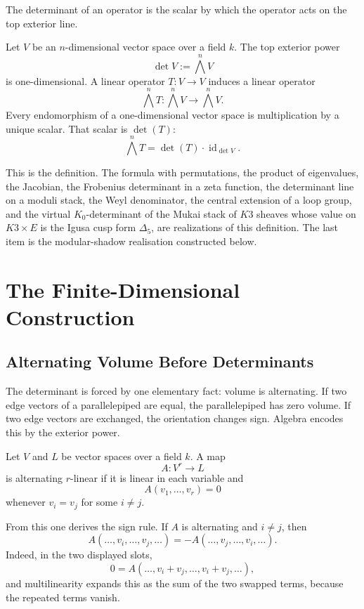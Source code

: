\documentclass[11pt]{memoir}
\providecommand{\id}{\operatorname{id}}
\begin{document}
The determinant of an operator is the scalar by which the operator acts
on the top exterior line.

Let \(V\) be an \(n\)-dimensional vector space over a field \(k\). The
top exterior power
\[
  \det V := \bigwedge^{n}V
\]
is one-dimensional. A linear operator \(T:V\to V\) induces a linear
operator
\[
  \bigwedge^{n}T:\bigwedge^{n}V\longrightarrow \bigwedge^{n}V.
\]
Every endomorphism of a one-dimensional vector space is multiplication
by a unique scalar. That scalar is \(\det(T)\):
\[
  \bigwedge^{n}T=\det(T)\cdot \id_{\det V}.
\]

This is the definition. The formula with permutations, the product of
eigenvalues, the Jacobian, the Frobenius determinant in a zeta
function, the determinant line on a moduli stack, the Weyl denominator,
the central extension of a loop group, and the virtual $K_0$-determinant
of the Mukai stack of $K3$ sheaves whose value on $K3 \times E$ is the
Igusa cusp form $\Delta_5$, are realizations of this definition. The
last item is the modular-shadow realisation constructed below.

\chapter{The Finite-Dimensional Construction}
\label{ch:finite}

\section{Alternating Volume Before Determinants}
\label{sec:alternating-volume}

The determinant is forced by one elementary fact: volume is alternating.
If two edge vectors of a parallelepiped are equal, the parallelepiped
has zero volume. If two edge vectors are exchanged, the orientation
changes sign. Algebra encodes this by the exterior power.

\begin{definition}
\label{def:alternating-map}
Let \(V\) and \(L\) be vector spaces over a field \(k\). A map
\[
  A:V^r\to L
\]
is alternating \(r\)-linear if it is linear in each variable and
\[
  A(v_1,\dots,v_r)=0
\]
whenever \(v_i=v_j\) for some \(i\neq j\).
\end{definition}

From this one derives the sign rule. If \(A\) is alternating and
\(i\neq j\), then
\[
  A(\dots,v_i,\dots,v_j,\dots)
  =
  -A(\dots,v_j,\dots,v_i,\dots).
\]
Indeed, in the two displayed slots,
\[
  0=A(\dots,v_i+v_j,\dots,v_i+v_j,\dots),
\]
and multilinearity expands this as the sum of the two swapped terms,
because the repeated terms vanish.
\end{document}
